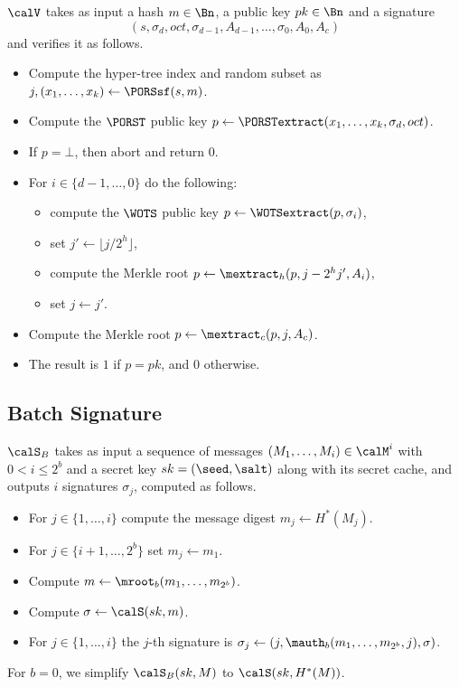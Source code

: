 $\calV$ takes as input a hash $m \in \Bn$, a public key $pk \in \Bn$ and a signature
\[(s, \sigma_d, oct, \sigma_{d-1}, A_{d-1}, \ldots, \sigma_0, A_0, A_c)\]
and verifies it as follows.

\begin{itemize}
\item Compute the hyper-tree index and random subset as $j, (x_1, \ldots, x_k) \gets \PORSsf(s, m)$.
\item Compute the $\PORST$ public key $p \gets \PORSTextract(x_1, \ldots, x_k, \sigma_d, oct)$.
\item If $p = \bot$, then abort and return $0$.
\item For $i \in \{d-1, \ldots, 0\}$ do the following:
    \begin{itemize}
    \item compute the $\WOTS$ public key $p \gets \WOTSextract(p, \sigma_i)$,
    \item set $j' \gets \lfloor j / 2^h \rfloor$,
    \item compute the Merkle root $p \gets \mextract_h(p, j - 2^h j', A_i)$,
    \item set $j \gets j'$.
    \end{itemize}
\item Compute the Merkle root $p \gets \mextract_c(p, j, A_c)$.
\item The result is $1$ if $p = pk$, and $0$ otherwise.
\end{itemize}

\subsection{Batch Signature}

$\calS_B$ takes as input a sequence of messages $(M_1, \ldots, M_i) \in \calM^i$ with $0 < i \le 2^b$ and a secret key $sk = (\seed, \salt)$ along with its secret cache, and outputs $i$ signatures $\sigma_j$, computed as follows.

\begin{itemize}
\item For $j \in \{1, \ldots, i\}$ compute the message digest $m_j \gets H^*(M_j)$.
\item For $j \in \{i+1, \ldots, 2^b\}$ set $m_j \gets m_1$.
\item Compute $m \gets \mroot_b(m_1, \ldots, m_{2^b})$.
\item Compute $\sigma \gets \calS(sk, m)$.
\item For $j \in \{1, \ldots, i\}$ the $j$-th signature is $\sigma_j \gets (j, \mauth_b(m_1, \ldots, m_{2^b}, j), \sigma)$.
\end{itemize}
%
For $b=0$, we simplify $\calS_B(sk, M)$ to $\calS(sk, H^*(M))$.

